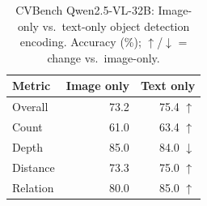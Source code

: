 \begin{table}[htbp]
\centering
\caption{CVBench Qwen2.5-VL-32B: Image-only vs.\ text-only object detection encoding. Accuracy (\%); $\uparrow$/$\downarrow$ = change vs.\ image-only.}
\label{tab:cvbench-32b-compare}
\begin{tabular}{lrr}
\toprule
Metric & Image only & Text only \\
\midrule
Overall & 73.2 & 75.4 $\uparrow$ \\
Count & 61.0 & 63.4 $\uparrow$ \\
Depth & 85.0 & 84.0 $\downarrow$ \\
Distance & 73.3 & 75.0 $\uparrow$ \\
Relation & 80.0 & 85.0 $\uparrow$ \\
\bottomrule
\end{tabular}
\end{table}